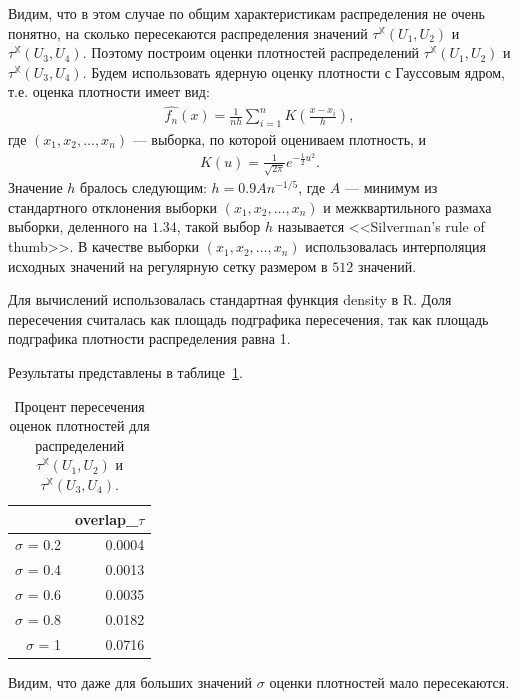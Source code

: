 \documentclass[specialist,
               substylefile = spbu.rtx,
               subf,href,colorlinks=true, 12pt]{disser}
\begin{document}
Видим, что в этом случае по общим характеристикам распределения не очень понятно, на сколько пересекаются распределения значений $\tau^{\mathbb{X}}(U_1, U_2)$ и  $\tau^{\mathbb{X}}(U_3, U_4)$.
Поэтому построим оценки плотностей распределений $\tau^{\mathbb{X}}(U_1, U_2)$ и  $\tau^{\mathbb{X}}(U_3, U_4)$.
Будем использовать ядерную оценку плотности с Гауссовым ядром, т.е. оценка плотности имеет вид:
\begin{gather*}
\hat{f_n}(x) = \frac{1}{nh} \sum_{i = 1}^{n}{K\left(\frac{x - x_i}{h}\right)},
\end{gather*}
где $(x_1,x_2,\ldots,x_n)$ --- выборка, по которой оцениваем плотность, и 
\begin{gather*}
K(u) = \frac{1}{\sqrt{2\pi}}{e^{-\frac{1}{2}u^2}}.
\end{gather*}
Значение $h$ бралось следующим: $h = 0.9 A n^{-1/5}$, где $A$ --- минимум из стандартного отклонения выборки $(x_1,x_2,\ldots,x_n)$ и межквартильного размаха выборки, деленного на $1.34$, такой выбор $h$ называется <<Silverman’s rule of thumb>>. В качестве выборки $(x_1,x_2,\ldots,x_n)$ использовалась интерполяция исходных значений на регулярную сетку размером в $512$ значений. 

Для вычислений использовалась стандартная функция density в R. 
Доля пересечения считалась как площадь подграфика пересечения, так как площадь подграфика плотности распределения равна 1.

Результаты представлены в таблице~\ref{tab:model_dist_tau1_overlap_sig_noise_notint}. 

\begin{table}[hhh!]
\caption{Процент пересечения оценок плотностей для распределений $\tau^{\mathbb{X}}(U_1, U_2)$ и $\tau^{\mathbb{X}}(U_3, U_4)$.}
\centering
\begin{tabular}{rr}
  \hline
 & overlap\_$\tau$ \\ 
  \hline
$\sigma$ = 0.2 & 0.0004 \\ 
  $\sigma$ = 0.4 & 0.0013 \\ 
  $\sigma$ = 0.6 & 0.0035 \\ 
  $\sigma$ = 0.8 & 0.0182 \\ 
  $\sigma$ = 1 & 0.0716 \\ 
   \hline
\end{tabular}
\label{tab:model_dist_tau1_overlap_sig_noise_notint}
\end{table}

Видим, что даже для больших значений $\sigma$ оценки плотностей мало пересекаются.  
\end{document}
